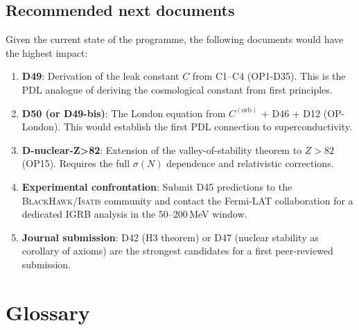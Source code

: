 \documentclass[11pt,a4paper]{article}
\theoremstyle{plain}
\theoremstyle{definition}
\theoremstyle{remark}
\newcommand{\sigmaN}{\sigma(N)}
\begin{document}
\subsection{Recommended next documents}
\label{subsec:nextdocs}
Given the current state of the programme, the following documents would have the highest impact:

\begin{enumerate}
\item \textbf{D49}: Derivation of the leak constant $C$ from C1--C4 (OP1-D35). This is the PDL analogue of deriving the cosmological constant from first principles.
\item \textbf{D50 (or D49-bis)}: The London equation from $C^{(\mathrm{orb})}$ + D46 + D12 (OP-London). This would establish the first PDL connection to superconductivity.
\item \textbf{D-nuclear-Z>82}: Extension of the valley-of-stability theorem to $Z>82$ (OP15). Requires the full $\sigmaN$ dependence and relativistic corrections.
\item \textbf{Experimental confrontation}: Submit D45 predictions to the \textsc{BlackHawk}/\textsc{Isatis} community and contact the Fermi-LAT collaboration for a dedicated IGRB analysis in the 50--200\,MeV window.
\item \textbf{Journal submission}: D42 (H3 theorem) or D47 (nuclear stability as corollary of axioms) are the strongest candidates for a first peer-reviewed submission.
\end{enumerate}

\section{Glossary}
\label{sec:glossary}
\end{document}

